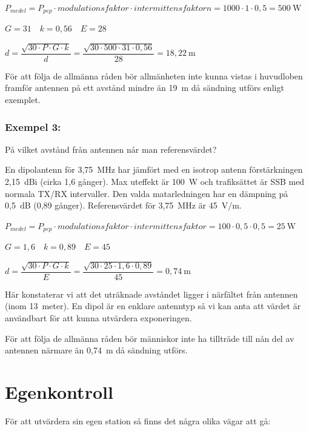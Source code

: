 \(P_{medel} = P_{pep} \cdot modulationsfaktor \cdot intermittensfaktorn
= 1000 \cdot 1 \cdot 0,5 = 500\ \mathrm{W}\)

\(G = 31 \quad k = 0,56 \quad E = 28\)

\(d = \dfrac{\sqrt{30 \cdot P \cdot G \cdot k}}{d}
= \dfrac{\sqrt{30 \cdot 500 \cdot 31 \cdot 0,56}}{28}
= 18,22\ \mathrm{m}\)

För att följa de allmänna råden bör allmänheten inte kunna vistas i huvudloben
framför antennen på ett avstånd mindre än 19~m då sändning utförs enligt
exemplet.

\subsubsection{Exempel 3:}

På vilket avstånd från antennen når man referensvärdet?

En dipolantenn för 3,75~MHz har jämfört med en isotrop antenn förstärkningen
2,15~dBi (cirka 1,6 gånger).
Max uteffekt är 100~W och trafiksättet är SSB med normala TX/RX intervaller.
Den valda matarledningen har en dämpning på 0,5~dB (0,89 gånger).
Referensvärdet för 3,75~MHz är 45~V/m.

\(P_{medel} = P_{pep} \cdot modulationsfaktor \cdot intermittensfaktor
= 100 \cdot 0,5 \cdot 0,5 = 25\ \mathrm{W}\)

\(G = 1,6 \quad k = 0,89 \quad E = 45\)

\(d = \dfrac{\sqrt{30 \cdot P \cdot G \cdot k}}{E} = \dfrac{\sqrt{30 \cdot 25 \cdot 1,6 \cdot 0,89}}{45}
= 0,74\ \mathrm{m}\)

Här konstaterar vi att det uträknade avståndet ligger i närfältet från antennen
(inom 13~meter).
En dipol är en enklare antenntyp så vi kan anta att värdet är användbart för att
kunna utvärdera exponeringen.

För att följa de allmänna råden bör människor inte ha tillträde till
nån del av antennen närmare än 0,74~m då sändning utförs.

\section{Egenkontroll}

För att utvärdera sin egen station så finns det några olika vägar att gå:

